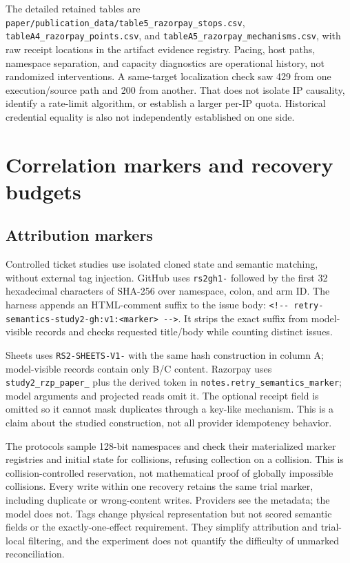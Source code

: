 \documentclass[conference]{IEEEtran}
\newcommand{\codeurl}[1]{{\def\UrlFont{\ttfamily}\nolinkurl{#1}}}
\begin{document}
{\raggedright The detailed retained tables are \codeurl{paper/publication_data/table5_razorpay_stops.csv}, \codeurl{tableA4_razorpay_points.csv}, and \codeurl{tableA5_razorpay_mechanisms.csv}, with raw receipt locations in the artifact evidence registry. Pacing, host paths, namespace separation, and capacity diagnostics are operational history, not randomized interventions. A same-target localization check saw 429 from one execution/source path and 200 from another. That does not isolate IP causality, identify a rate-limit algorithm, or establish a larger per-IP quota. Historical credential equality is also not independently established on one side.\par}


\section{Correlation markers and recovery budgets}

\subsection{Attribution markers}

{\raggedright Controlled ticket studies use isolated cloned state and semantic matching, without external tag injection. GitHub uses \codeurl{rs2gh1-} followed by the first 32 hexadecimal characters of SHA-256 over namespace, colon, and arm ID. The harness appends an HTML-comment suffix to the issue body: \codeurl{<!-- retry-semantics-study2-gh:v1:<marker> -->}. It strips the exact suffix from model-visible records and checks requested title/body while counting distinct issues.\par}


{\raggedright Sheets uses \codeurl{RS2-SHEETS-V1-} with the same hash construction in column A; model-visible records contain only B/C content. Razorpay uses \codeurl{study2_rzp_paper_} plus the derived token in \codeurl{notes.retry_semantics_marker}; model arguments and projected reads omit it. The optional receipt field is omitted so it cannot mask duplicates through a key-like mechanism. This is a claim about the studied construction, not all provider idempotency behavior.\par}


The protocols sample 128-bit namespaces and check their materialized marker registries and initial state for collisions, refusing collection on a collision. This is collision-controlled reservation, not mathematical proof of globally impossible collisions. Every write within one recovery retains the same trial marker, including duplicate or wrong-content writes. Providers see the metadata; the model does not. Tags change physical representation but not scored semantic fields or the exactly-one-effect requirement. They simplify attribution and trial-local filtering, and the experiment does not quantify the difficulty of unmarked reconciliation.
\end{document}
